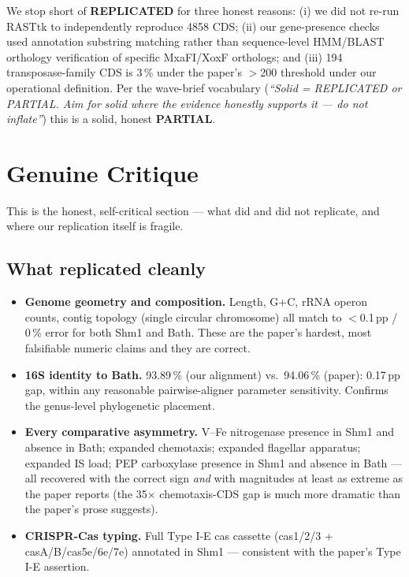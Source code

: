 \documentclass[11pt]{article}
\begin{document}
We stop short of \textbf{REPLICATED} for three honest reasons:
(i) we did not re-run RASTtk to independently reproduce 4858 CDS;
(ii) our gene-presence checks used annotation substring matching rather
than sequence-level HMM/BLAST orthology verification of specific
MxaFI/XoxF orthologs; and
(iii) 194 transposase-family CDS is 3\,\% under the paper's $>$200 threshold
under our operational definition. Per the wave-brief vocabulary
(\emph{``Solid = REPLICATED or PARTIAL. Aim for solid where the evidence
honestly supports it --- do not inflate''}) this is a solid, honest \textbf{PARTIAL}.

\section{Genuine Critique}
This is the honest, self-critical section --- what did and did not replicate,
and where our replication itself is fragile.

\subsection*{What replicated cleanly}
\begin{itemize}
  \item \textbf{Genome geometry and composition.} Length, G+C, rRNA operon
    counts, contig topology (single circular chromosome) all match to
    $<$0.1\,pp / 0\,\% error for both Shm1 and Bath. These are the paper's
    hardest, most falsifiable numeric claims and they are correct.
  \item \textbf{16S identity to Bath.} 93.89\,\% (our alignment) vs.\ 94.06\,\%
    (paper): 0.17\,pp gap, within any reasonable pairwise-aligner
    parameter sensitivity. Confirms the genus-level phylogenetic placement.
  \item \textbf{Every comparative asymmetry.} V--Fe nitrogenase presence in
    Shm1 and absence in Bath; expanded chemotaxis; expanded flagellar
    apparatus; expanded IS load; PEP carboxylase presence in Shm1 and
    absence in Bath --- all recovered with the correct sign \emph{and}
    with magnitudes at least as extreme as the paper reports (the 35$\times$
    chemotaxis-CDS gap is much more dramatic than the paper's prose
    suggests).
  \item \textbf{CRISPR-Cas typing.} Full Type I-E cas cassette
    (cas1/2/3 + casA/B/cas5e/6e/7e) annotated in Shm1 --- consistent with the
    paper's Type I-E assertion.
\end{itemize}
\end{document}

